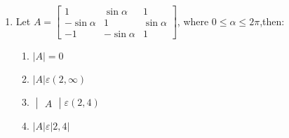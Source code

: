 \documentclass{article}
\newcommand{\myvec}[1]{\begin{bmatrix}#1\end{bmatrix}}
\newcommand{\mydet}[1]{\begin{vmatrix}#1\end{vmatrix}}
\begin{document}
\begin{enumerate}
    \item  Let $A =\myvec{1 & \sin\alpha & 1\\-\sin\alpha & 1 & \sin\alpha\\-1 & -\sin\alpha & 1}$, where $0 \leq \alpha \leq2\pi$,then: 
    \begin{enumerate}
        \item $|A|=0$
        \item $|A| \varepsilon (2,\infty)$
        \item $\mydet{A} \varepsilon (2,4)$
        \item $|A| \varepsilon |2,4|$
    \end{enumerate}
    
\end{enumerate}
\end{document}
